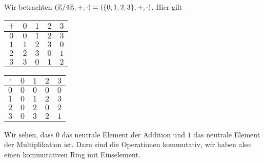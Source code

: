 \begin{example}{}{}



Wir betrachten \((\mathbb{Z}/4\mathbb{Z}, +,\cdot)=(\{0,1,2,3\},+,\cdot)\). Hier gilt


\begin{center}
\centering
\begin{tabularx}{\linewidth}[{\linewidth}]{|c|c|c|c|c|}\hline
 
\(+\)
& 
\(0\)
& 
\(1\)
& 
\(2\)
& 
\(3\)
\\
\hline
\(0\)
&
\(0\)
&
\(1\)
&
\(2\)
&
\(3\)
\\
\hline
\(1\)
&
\(1\)
&
\(2\)
&
\(3\)
&
\(0\)
\\
\hline
\(2\)
&
\(2\)
&
\(3\)
&
\(0\)
&
\(1\)
\\
\hline
\(3\)
&
\(3\)
&
\(0\)
&
\(1\)
&
\(2\)
\\
\hline
\end{tabularx}
\end{center}


\begin{center}
\centering
\begin{tabularx}{\linewidth}[{\linewidth}]{|c|c|c|c|c|}\hline
 
\(\cdot\)
& 
\(0\)
& 
\(1\)
& 
\(2\)
& 
\(3\)
\\
\hline
\(0\)
&
\(0\)
&
\(0\)
&
\(0\)
&
\(0\)
\\
\hline
\(1\)
&
\(0\)
&
\(1\)
&
\(2\)
&
\(3\)
\\
\hline
\(2\)
&
\(0\)
&
\(2\)
&
\(0\)
&
\(2\)
\\
\hline
\(3\)
&
\(0\)
&
\(3\)
&
\(2\)
&
\(1\)
\\
\hline
\end{tabularx}
\end{center}

Wir sehen, dass \(0\) das neutrale Element der Addition und \(1\) das neutrale Element der Multiplikation ist. Dazu sind die Operationen kommutativ, wir haben also einen kommutativen Ring mit Einselement.
\end{example}


